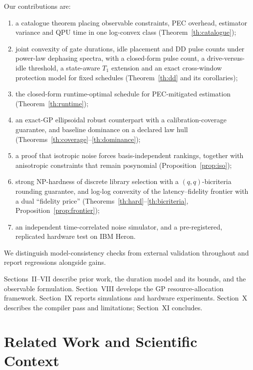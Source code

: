 \documentclass[10pt,letterpaper,journal]{IEEEtran}
\begin{document}
Our contributions are:
\begin{enumerate}
\item a catalogue theorem placing observable constraints, PEC overhead, estimator variance and QPU time in one log-convex class (Theorem~\ref{th:catalogue});
\item joint convexity of gate durations, idle placement and DD pulse counts under power-law dephasing spectra, with a closed-form pulse count, a drive-versus-idle threshold, a state-aware $T_1$ extension and an exact cross-window protection model for fixed schedules (Theorem~\ref{th:dd} and its corollaries);
\item the closed-form runtime-optimal schedule for PEC-mitigated estimation (Theorem~\ref{th:runtime});
\item an exact-GP ellipsoidal robust counterpart with a calibration-coverage guarantee, and baseline dominance on a declared law hull (Theorems~\ref{th:coverage}--\ref{th:dominance});
\item a proof that isotropic noise forces basis-independent rankings, together with anisotropic constraints that remain posynomial (Proposition~\ref{prop:iso});
\item strong NP-hardness of discrete library selection with a $(q,q)$-bicriteria rounding guarantee, and log-log convexity of the latency--fidelity frontier with a dual ``fidelity price'' (Theorems~\ref{th:hard}--\ref{th:bicriteria}, Proposition~\ref{prop:frontier});
\item an independent time-correlated noise simulator, and a pre-registered, replicated hardware test on IBM Heron.
\end{enumerate}
We distinguish model-consistency checks from external validation throughout and report regressions alongside gains.

Sections~II--VII describe prior work, the duration model and its bounds, and the observable formulation. Section~VIII develops the GP resource-allocation framework. Section~IX reports simulations and hardware experiments. Section~X describes the compiler pass and limitations; Section~XI concludes.

\section{Related Work and Scientific Context}
\end{document}
